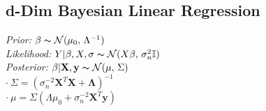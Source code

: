 \subsection*{d-Dim Bayesian Linear Regression}
\textit{Prior: } $\beta \thicksim \mathcal{N}(\mu_0,\,\Lambda^{-1})$ \\
\textit{Likelihood:} $Y|\beta,X,\sigma \thicksim \mathcal{N}(X\beta,\,\sigma_n^2 \mathbb{I})$ \\
\textit{Posterior: }$\beta|\mathbf{X},\mathbf{y} \thicksim \mathcal{N}(\mu,\,\Sigma)$\\
$\cdot \  \Sigma = (\sigma_n^{-2}\mathbf{X}^T\mathbf{X} + \bm{\Lambda})^{-1}$ \\
$\cdot \  \mu = \Sigma(\Lambda\mu_0 + \sigma_n^{-2}\mathbf{X}^T\mathbf{y})$


